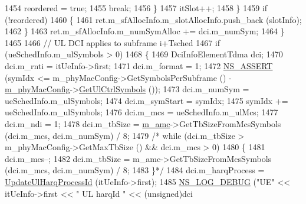 \begin{DoxyCode}
1454                                         reordered = \textcolor{keyword}{true};
1455                                         \textcolor{keywordflow}{break};
1456                                 \}
1457                                 itSlot++;
1458                         \}
1459                         \textcolor{keywordflow}{if} (!reordered)
1460                         \{
1461                                 ret.m\_sfAllocInfo.m\_slotAllocInfo.push\_back (slotInfo);
1462                         \}
1463                         ret.m\_sfAllocInfo.m\_numSymAlloc += dci.m\_numSym;
1464                 \}
1465 
1466                 \textcolor{comment}{// UL DCI applies to subframe i+Tsched}
1467                 \textcolor{keywordflow}{if} (ueSchedInfo.m\_ulSymbols > 0)
1468                 \{
1469                         DciInfoElementTdma dci;
1470                         dci.m\_rnti = itUeInfo->first;
1471                         dci.m\_format = 1;
1472                         \hyperlink{assert_8h_a6dccdb0de9b252f60088ce281c49d052}{NS\_ASSERT} (symIdx <= m\_phyMacConfig->GetSymbolsPerSubframe () - 
      \hyperlink{classns3_1_1MmWaveMacScheduler_a24d7af4971d2e500fe543cefbafa2fd9}{m\_phyMacConfig}->\hyperlink{classns3_1_1MmWavePhyMacCommon_aa0bf8af14050bc5dc6513fbc86319a9b}{GetUlCtrlSymbols} ());
1473                         dci.m\_numSym = ueSchedInfo.m\_ulSymbols;
1474                         dci.m\_symStart = symIdx;
1475                         symIdx += ueSchedInfo.m\_ulSymbols;
1476                         dci.m\_mcs = ueSchedInfo.m\_ulMcs;
1477                         dci.m\_ndi = 1;
1478                         dci.m\_tbSize = \hyperlink{classns3_1_1MmWaveFlexTtiMacScheduler_a80d0b9fd279dd5c33c52cf0833d264da}{m\_amc}->GetTbSizeFromMcsSymbols (dci.m\_mcs, dci.m\_numSym) / 8;
1479                 \textcolor{comment}{/*      while (dci.m\_tbSize > m\_phyMacConfig->GetMaxTbSize () && dci.m\_mcs > 0)}
1480 \textcolor{comment}{                        \{}
1481 \textcolor{comment}{                                dci.m\_mcs--;}
1482 \textcolor{comment}{                                dci.m\_tbSize = m\_amc->GetTbSizeFromMcsSymbols (dci.m\_mcs, dci.m\_numSym) /
       8;}
1483 \textcolor{comment}{                        \}*/}
1484                         dci.m\_harqProcess = \hyperlink{classns3_1_1MmWaveFlexTtiMacScheduler_a2e7e646b6f8b35625d1284d04c167881}{UpdateUlHarqProcessId} (itUeInfo->first);
1485                         \hyperlink{group__logging_ga413f1886406d49f59a6a0a89b77b4d0a}{NS\_LOG\_DEBUG} (\textcolor{stringliteral}{"UE"} << itUeInfo->first << \textcolor{stringliteral}{" UL harqId "} << (\textcolor{keywordtype}{unsigned})dci

\end{DoxyCode}
